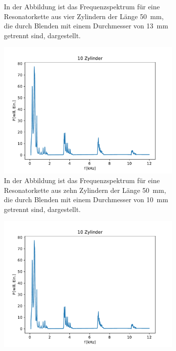 \begin{figure}
\begin{subfigure}[b]{0.45\textwidth}
                    \caption{In der Abbildung ist das Frequenzspektrum für eine Resonatorkette aus vier Zylindern der Länge \SI{50}{\milli\metre}, die durch Blenden mit einem Durchmesser von \SI{13}{\milli\metre} getrennt sind, dargestellt.}
                    \label{fig:1dim_4_Zylinder_13mm}
                \end{subfigure}
                \centering
                \begin{subfigure}[b]{0.45\textwidth}
                    \centering
                    \includegraphics[scale=0.45]{./pictures/1dim_10_Zylinder_10mm.pdf}
                    \caption{In der Abbildung ist das Frequenzspektrum für eine Resonatorkette aus zehn Zylindern der Länge \SI{50}{\milli\metre}, die durch Blenden mit einem Durchmesser von \SI{10}{\milli\metre} getrennt sind, dargestellt.}
                    \label{fig:1dim_10_Zylinder_10mm}
                \end{subfigure}
                \centering
                \begin{subfigure}[b]{0.45\textwidth}
                    \centering
                    \includegraphics[scale=0.45]{./pictures/1dim_10_Zylinder_13mm.pdf}

\end{subfigure}
\end{figure}
